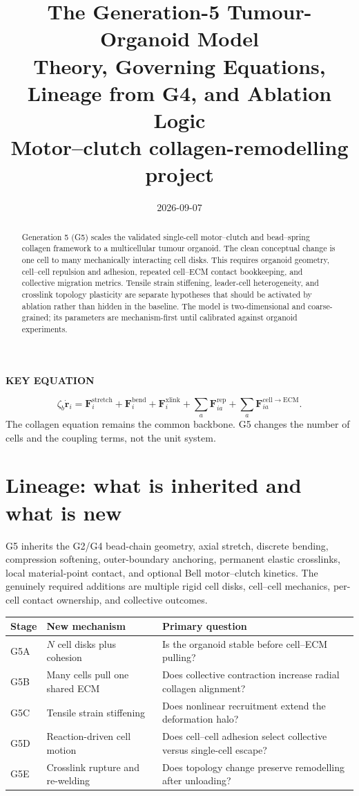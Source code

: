 \documentclass[10.5pt]{article}
\title{\vspace{-1.2cm}\textbf{The Generation-5 Tumour-Organoid Model}\\[3pt]
\large Theory, Governing Equations, Lineage from G4, and Ablation Logic\\[6pt]
\normalsize\textnormal{Motor--clutch collagen-remodelling project}}
\author{}
\date{2026-09-07}
\newcommand{\rv}{\mathbf r}
\newcommand{\Fv}{\mathbf F}
\newcommand{\keylabel}{\par\smallskip\noindent\textcolor{g5}{\textbf{KEY EQUATION}}\par\vspace{-5pt}}
\begin{document}
\maketitle
\vspace{-1cm}

\begin{abstract}
Generation 5 (G5) scales the validated single-cell motor--clutch and bead--spring collagen
framework to a multicellular tumour organoid. The clean conceptual change is one cell to many
mechanically interacting cell disks. This requires organoid geometry, cell--cell repulsion and
adhesion, repeated cell--ECM contact bookkeeping, and collective migration metrics. Tensile
strain stiffening, leader-cell heterogeneity, and crosslink topology plasticity are separate
hypotheses that should be activated by ablation rather than hidden in the baseline. The model is
two-dimensional and coarse-grained; its parameters are mechanism-first until calibrated against
organoid experiments.
\end{abstract}

\keylabel
\begin{equation}
 \zeta_b\dot{\rv}_i=
 \Fv_i^{\mathrm{stretch}}+\Fv_i^{\mathrm{bend}}+\Fv_i^{\mathrm{xlink}}
 +\sum_a\Fv_{ia}^{\mathrm{rep}}+
 \sum_a\Fv_{ia}^{\mathrm{cell\to ECM}}.
 \label{eq:backbone}
\end{equation}
The collagen equation remains the common backbone. G5 changes the number of cells and the
coupling terms, not the unit system.

\tableofcontents

\section{Lineage: what is inherited and what is new}

G5 inherits the G2/G4 bead-chain geometry, axial stretch, discrete bending, compression
softening, outer-boundary anchoring, permanent elastic crosslinks, local material-point contact,
and optional Bell motor--clutch kinetics. The genuinely required additions are multiple rigid
cell disks, cell--cell mechanics, per-cell contact ownership, and collective outcomes.

\begin{longtable}{>{\raggedright\arraybackslash}p{}p{}p{}}
\toprule
Stage & New mechanism & Primary question \\
\midrule
G5A & $N$ cell disks plus cohesion & Is the organoid stable before cell--ECM pulling? \\
G5B & Many cells pull one shared ECM & Does collective contraction increase radial collagen
alignment? \\
G5C & Tensile strain stiffening & Does nonlinear recruitment extend the deformation halo? \\
G5D & Reaction-driven cell motion & Does cell--cell adhesion select collective versus
single-cell escape? \\
G5E & Crosslink rupture and re-welding & Does topology change preserve remodelling after
unloading? \\
\bottomrule
\end{longtable}
\end{document}
